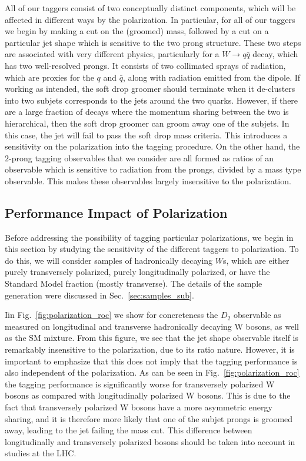 \documentclass[11pt,letterpaper]{article}
\DeclareRobustCommand{\Sec}[1]{Sec.~\ref{#1}}
\DeclareRobustCommand{\Fig}[1]{Fig.~\ref{#1}}
\begin{document}
All of our taggers consist of two conceptually distinct components, which will be affected in different ways by the polarization.
%
In particular, for all of our taggers we begin by making a cut on the (groomed) mass, followed by a cut on a particular jet shape which is sensitive to the two prong structure. These two steps are associated with very different physics, particularly for a $W\to q\bar q$ decay, which has two well-resolved prongs.
%
It consists of two collimated sprays of radiation, which are proxies for the $q$ and $\bar q$, along with radiation emitted from the dipole.
%
If working as intended, the soft drop groomer should terminate when it de-clusters into two subjets corresponds to the jets around the two quarks.
%
However, if there are a large fraction of decays where the momentum sharing between the two is hierarchical, then the soft drop groomer can groom away one of the subjets.
%
In this case, the jet will fail to pass the soft drop mass criteria.
%
This introduces a sensitivity on the polarization into the tagging procedure.
%
On the other hand, the $2$-prong tagging observables that we consider are all formed as ratios of an observable which is sensitive to radiation from the prongs, divided by a mass type observable.
%
This makes these observables largely insensitive to the polarization.

\subsection{Performance Impact of Polarization}\label{sec:polar_robust}


Before addressing the possibility of tagging particular polarizations, we begin in this section by studying the sensitivity of the different taggers to polarization. To do this, we will consider samples of hadronically decaying $W$s, which are either purely transversely polarized, purely longitudinally polarized, or have the Standard Model fraction (mostly transverse). The details of the sample generation were discussed in \Sec{sec:samples_sub}.

Iin \Fig{fig:polarization_roc} we show for concreteness the $D_2$ observable as measured on longitudinal and transverse hadronically decaying W bosons, as well as the SM mixture. From this figure, we see that the jet shape observable itself is remarkably insensitive to the polarization, due to its ratio nature. However, it is important to emphasize that this does not imply that the tagging performance is also independent of the polarization. As can be seen in \Fig{fig:polarization_roc} the tagging performance is significantly worse for transversely polarized W bosons as compared with longitudinally polarized W bosons. This is due to the fact that transversely polarized W bosons have a more asymmetric energy sharing, and it is therefore more likely that one of the subjet prongs is groomed away, leading to the jet failing the mass cut. This difference between longitudinally and transversely polarized bosons should be taken into account in studies at the LHC.
\end{document}
